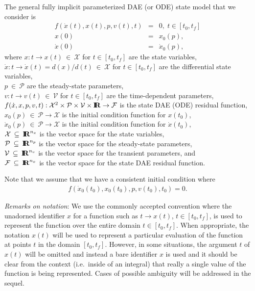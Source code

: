 \documentclass[pdf,ps2pdf,11pt]{SANDreport}
\begin{document}
The general fully implicit parameterized DAE (or ODE) state model that we
consider is
%
\begin{eqnarray}
f\left( \dot{x}(t), x(t), p, v(t), t \right) & = & 0,
\; t \in \left[ t_0, t_f \right] \label{eqn:sens:f} \\
x(0) & = & x_0(p), \label{eqn:sens:f:ic} \\
\dot{x}(0) & = & \dot{x}_0(p), \label{eqn:sens:f:ic-dot}
\end{eqnarray}
%
where
\bifthen
%
{}\> $x: t {}\rightarrow x(t){}\:\in\:\mathcal{X}$ for $t\in[t_0,t_f]$ are the
state variables, \\
%
{}\> $\dot{x}: t {}\rightarrow \dot{x}(t) = d(x)/d(t)\:\in\:\mathcal{X}$ for
$t\in[t_0,t_f]$ are the differential state variables,
\\
%
{}\> $p{}\:\in\:\mathcal{P}$ are the steady-state parameters,\\
%
{}\> $v: t {}\rightarrow v(t){}\:\in\:\mathcal{V}$ for $t\in[t_0,t_f]$ are the
time-dependent parameters, \\
%
{}\> $f(\dot{x}, x, p, v, t)
:{}\mathcal{X}^2{}\times{}\mathcal{P}{}\times{}\mathcal{V}{}\times{}\mbox{\textbf{I}}\hspace{-0.6ex}\mbox{\textbf{R}}
{}\rightarrow{}\mathcal{F}$ is the state DAE (ODE) residual function, \\
%
{}\> $x_0(p){}\:\in\:\mathcal{P}{}\rightarrow{}\mathcal{X}$ is the initial
condition function for $x(t_0)$, \\
%
{}\> $\dot{x}_0(p){}\:\in\:\mathcal{P}{}\rightarrow{}\mathcal{X}$ is the
initial condition function for $\dot{x}(t_0)$, \\
%
{}\> $\mathcal{X}{}\:\subseteq\:\mbox{\textbf{I}}\hspace{-0.6ex}\mbox{\textbf{R}}^{n_x}$ is the vector space for the state
variables, \\
%
{}\> $\mathcal{P}{}\:\subseteq\:\mbox{\textbf{I}}\hspace{-0.6ex}\mbox{\textbf{R}}^{n_p}$ is the vector space for the
steady-state parameters, \\
%
{}\> $\mathcal{V}{}\:\subseteq\:\mbox{\textbf{I}}\hspace{-0.6ex}\mbox{\textbf{R}}^{n_v}$ is the vector space for the
transient parameters, and \\
%
{}\> $\mathcal{F}{}\:\subseteq\:\mbox{\textbf{I}}\hspace{-0.6ex}\mbox{\textbf{R}}^{n_x}$ is the vector space for the state
DAE residual function.
\eifthen

Note that we assume that we have a consistent initial condition where
%
\begin{eqnarray}
f\left( \dot{x}_0(t_0), x_0(t_0), p, v(t_0), t_0 \right) = 0. \label{dae::consistent-ic}
\end{eqnarray}

{}\textit{Remarks on notation}: We use the commonly accepted convention where
the unadorned identifier $x$ for a function such as $t {}\rightarrow x(t)$,
$t\in[t_0,t_f]$, is used to represent the function over the entire domain
$t\in[t_0,t_f]$.  When appropriate, the notation $x(t)$ will be used to
represent a particular evaluation of the function at points $t$ in the domain
$[t_0,t_f]$.  However, in some situations, the argument $t$ of $x(t)$ will be
omitted and instead a bare identifier $x$ is used and it should be clear from
the context (i.e.\ inside of an integral) that really a single value of the
function is being represented.  Cases of possible ambiguity will be addressed
in the sequel.
\end{document}

